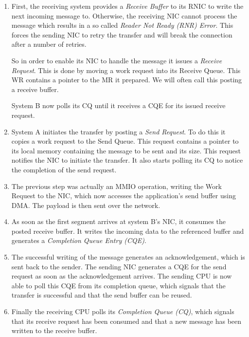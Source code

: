 \begin{enumerate}
  \item First, the receiving system provides a \emph{Receive Buffer} to its RNIC to write the next incoming message to.
    Otherwise, the receiving NIC cannot process the message which results in a so called \emph{Reader Not Ready (RNR) Error}.
    This forces the sending NIC to retry the transfer and will break the connection after a number of retries.

    So in order to enable its NIC to handle the message it issues a \emph{Receive Request}. This is done by moving a work request into its 
    Receive Queue. This WR contains a pointer to the MR it prepared. We will often call this posting a receive buffer. 

    System B now polls its CQ until it receives a CQE for its issued receive request.

  \item System A initiates the transfer by posting a \emph{Send Request}. To do this it copies a work request to 
    the Send Queue. This request contains a pointer to its local memory containing the  message to be sent
    and its size. This request notifies the NIC to initiate the transfer.
    It also starts polling its CQ to notice the completion of the send request.

  \item The previous step was actually an MMIO operation, writing the Work Request to the NIC, which now 
    accesses the application's send buffer using DMA. The payload is then sent over the network.

  \item As soon as the first segment arrives at system B's NIC, it consumes the posted receive buffer. It writes the incoming
    data to the referenced buffer and generates a \emph{Completion Queue Entry (CQE)}. 

  \item The successful writing of the message generates an acknowledgement, which is sent back to the sender. The sending NIC
    generates a CQE for the send request as soon as the acknowledgement arrives. The sending CPU is now able to poll this CQE
    from its completion queue, which signals that the transfer is successful and that the send buffer can be reused.

  \item Finally the receiving CPU polls its \emph{Completion Queue (CQ)}, which signals that its receive request has been 
    consumed and that a new message has been written to the receive buffer.
\end{enumerate}

